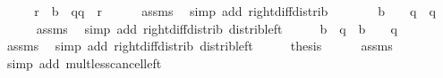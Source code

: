 \begin{isabellebody}
%
\isadelimproof
%
\endisadelimproof
%
\isatagproof
{}\isamarkupfalse%
\ {\isacharminus}{\kern0pt}\isanewline
\ \ \isamarkupfalse%
\ {\isachardoublequoteopen}r{\isacharprime}{\kern0pt}\ {\isacharplus}{\kern0pt}\ b\ {\isacharasterisk}{\kern0pt}\ {\isacharparenleft}{\kern0pt}q{\isacharprime}{\kern0pt}{\isacharminus}{\kern0pt}q{\isacharparenright}{\kern0pt}\ {\isasymle}\ r{\isachardoublequoteclose}\isanewline
\ \ \ \ \isamarkupfalse%
\ assms\ \isamarkupfalse%
\ {\isacharparenleft}{\kern0pt}simp\ add{\isacharcolon}{\kern0pt}\ right{\isacharunderscore}{\kern0pt}diff{\isacharunderscore}{\kern0pt}distrib{\isacharparenright}{\kern0pt}\isanewline
\ \ \isamarkupfalse%
\ \isamarkupfalse%
\ {\isachardoublequoteopen}{}\ {\isacharless}{\kern0pt}\ b\ {\isacharasterisk}{\kern0pt}\ {\isacharparenleft}{\kern0pt}{}\ {\isacharplus}{\kern0pt}\ q\ {\isacharminus}{\kern0pt}\ q{\isacharprime}{\kern0pt}{\isacharparenright}{\kern0pt}\ {\isachardoublequoteclose}\isanewline
\ \ \ \ \isamarkupfalse%
\ assms\ \isamarkupfalse%
\ {\isacharparenleft}{\kern0pt}simp\ add{\isacharcolon}{\kern0pt}\ right{\isacharunderscore}{\kern0pt}diff{\isacharunderscore}{\kern0pt}distrib\ distrib{\isacharunderscore}{\kern0pt}left{\isacharparenright}{\kern0pt}\isanewline
\ \ \isamarkupfalse%
\ \isamarkupfalse%
\ {\isachardoublequoteopen}b\ {\isacharasterisk}{\kern0pt}\ q{\isacharprime}{\kern0pt}\ {\isacharless}{\kern0pt}\ b\ {\isacharasterisk}{\kern0pt}\ {\isacharparenleft}{\kern0pt}{}\ {\isacharplus}{\kern0pt}\ q{\isacharparenright}{\kern0pt}{\isachardoublequoteclose}\isanewline
\ \ \ \ \isamarkupfalse%
\ assms\ \isamarkupfalse%
\ {\isacharparenleft}{\kern0pt}simp\ add{\isacharcolon}{\kern0pt}\ right{\isacharunderscore}{\kern0pt}diff{\isacharunderscore}{\kern0pt}distrib\ distrib{\isacharunderscore}{\kern0pt}left{\isacharparenright}{\kern0pt}\isanewline
\ \ \isamarkupfalse%
\ \isamarkupfalse%
\ {\isacharquery}{\kern0pt}thesis\isanewline
\ \ \ \ \isamarkupfalse%
\ assms\ \isamarkupfalse%
\ {\isacharparenleft}{\kern0pt}simp\ add{\isacharcolon}{\kern0pt}\ mult{\isacharunderscore}{\kern0pt}less{\isacharunderscore}{\kern0pt}cancel{\isacharunderscore}{\kern0pt}left{\isacharparenright}{\kern0pt}\isanewline
{}\isamarkupfalse%
%
\endisatagproof
{\isafoldproof}%
%
\isadelimproof
\isanewline

\end{isabellebody}

